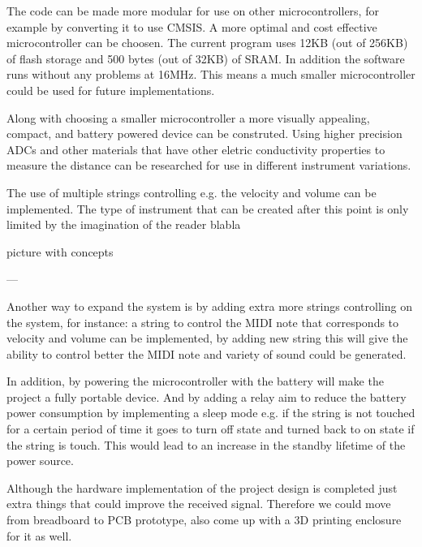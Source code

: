 \documentclass{article}
\begin{document}
The code can be made more modular for use on other microcontrollers, for example by converting it to use CMSIS. A more optimal and cost effective microcontroller can be choosen. The current program uses 12KB (out of 256KB) of flash storage and 500 bytes (out of 32KB) of SRAM. In addition the software runs without any problems at 16MHz. This means a much smaller microcontroller could be used for future implementations.

Along with choosing a smaller microcontroller a more visually appealing, compact, and battery powered device can be construted. Using higher precision ADCs and other materials that have other eletric conductivity properties to measure the distance can be researched for use in different instrument variations.

The use of multiple strings controlling e.g. the velocity and volume can be implemented. The type of instrument that can be created after this point is only limited by the imagination of the reader blabla

picture with concepts

---

Another way to expand the system is by adding extra more strings controlling on the system, for instance: a string to control the MIDI note that corresponds to velocity and volume can be implemented,  by adding new string this will give the ability to control better the MIDI note and variety of sound could be generated. 

In addition, by powering the microcontroller with the battery will make the project a fully portable device. And by adding a relay aim to reduce the battery power consumption by implementing a sleep mode e.g. if the string is not touched for a certain period of time it goes to turn off state and turned back to on state if the string is touch. This would lead to an increase in the standby lifetime of the power source.

Although the hardware implementation of the project design is completed just extra things that could improve the received signal. Therefore we could move from breadboard to PCB prototype, also come up with a 3D printing enclosure for it as well.
\end{document}

